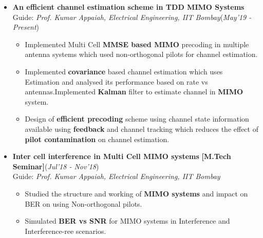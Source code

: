 \documentclass[10pt]{article}
\begin{document}

\vspace*{114pt}    %

\colorbox{bl}{}%

\begin{itemize}[leftmargin=0.4cm]


\item \textbf{An efficient channel estimation scheme in TDD MIMO Systems}\\
Guide: \textit{Prof. Kumar Appaiah, Electrical Engineering, IIT Bombay}\hfill{(\textit{May’19 - Present})}
    \begin{itemize}[leftmargin=0.5cm]
    \item Implemented Multi Cell \textbf{MMSE based MIMO }precoding in multiple antenna systems which used
non-orthogonal pilots for channel estimation.
    \item Implemented \textbf{covariance} based channel estimation which uses  Estimation and analysed its performance based on rate vs antennas.Implemented \textbf{Kalman} filter to estimate channel in \textbf{MIMO} system.
    \item  Design of \textbf{efficient precoding }scheme using channel state information available using \textbf{feedback} and channel
tracking which reduces the effect of \textbf{pilot contamination} on channel estimation.

    \end{itemize}



\item \textbf{Inter cell interference in Multi Cell MIMO systems} \textbf{[M.Tech Seminar]}\hfill{(\textit{Jul'18 - Nov'18})}\\
Guide: \textit{Prof. Kumar Appaiah, Electrical Engineering, IIT Bombay}
    \begin{itemize}
    \item Studied the structure and working of \textbf{MIMO systems} and impact on BER on using Non-orthogonal pilots.
    \item Simulated \textbf{BER vs SNR} for MIMO systems in Interference and Interference-ree scenarios.

    \end{itemize}
    
\end{itemize}
\end{document}
